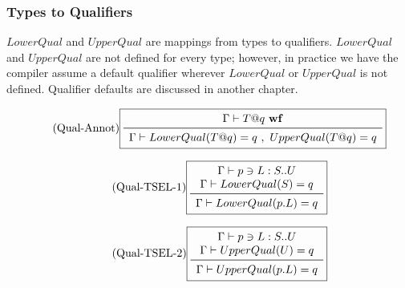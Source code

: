 \vspace{0.4cm}


\newpage

\subsubsection{Types to Qualifiers}


$LowerQual$ and $UpperQual$ are mappings from types to qualifiers.
$LowerQual$ and $UpperQual$ are not defined for every type;
however, in practice we have the compiler assume a default qualifier
wherever $LowerQual$ or $UpperQual$ is not defined.
Qualifier defaults are discussed in another chapter.

\begin{equation*}\tag{Qual-Annot}\label{equ-qual-annot}
\boxed{
\begin{array}{c}
\Gamma \vdash T@q\ {\bf wf} \\
\midrule
\Gamma \vdash LowerQual(T@q) = q\ ,\ UpperQual(T@q) = q \\
\end{array}
}
\end{equation*}

\vspace{0.4cm}

\begin{equation*}\tag{Qual-TSEL-1}\label{equ-qual-tsel-1}
\boxed{
\begin{array}{c}
\Gamma \vdash p \ni L:S..U \\
\Gamma \vdash LowerQual(S) = q \\
\midrule
\Gamma \vdash LowerQual(p.L) = q \\
\end{array}
}
\end{equation*}

\vspace{0.4cm}

\begin{equation*}\tag{Qual-TSEL-2}\label{equ-qual-tsel-2}
\boxed{
\begin{array}{c}
\Gamma \vdash p \ni L:S..U \\
\Gamma \vdash UpperQual(U) = q \\
\midrule
\Gamma \vdash UpperQual(p.L) = q \\
\end{array}
}
\end{equation*}

